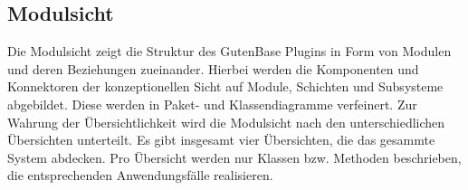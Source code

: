 



\subsection{Modulsicht}
Die Modulsicht zeigt die Struktur des GutenBase Plugins in Form von Modulen und deren Beziehungen zueinander. Hierbei werden die Komponenten und Konnektoren der konzeptionellen Sicht auf Module, Schichten und Subsysteme abgebildet. Diese werden in Paket- und Klassendiagramme verfeinert.
Zur Wahrung der Übersichtlichkeit wird die Modulsicht nach den unterschiedlichen Übersichten unterteilt. Es gibt insgesamt vier Übersichten, die das gesammte System abdecken. Pro Übersicht werden nur Klassen bzw. Methoden beschrieben, die entsprechenden Anwendungsfälle realisieren.


